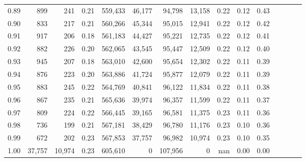 \begin{tabular}{rrrcrrrrrrrrrrr}
0.89 &     899 &     241 &                                       0.21 &  559,433 &   46,177 &   94,798 &  13,158 &  0.22 &  0.12 &                         0.43 \\
0.90 &     833 &     217 &                                       0.21 &  560,266 &   45,344 &   95,015 &  12,941 &  0.22 &  0.12 &                         0.42 \\
0.91 &     917 &     206 &                                       0.18 &  561,183 &   44,427 &   95,221 &  12,735 &  0.22 &  0.12 &                         0.41 \\
0.92 &     882 &     226 &                                       0.20 &  562,065 &   43,545 &   95,447 &  12,509 &  0.22 &  0.12 &                         0.40 \\
0.93 &     945 &     207 &                                       0.18 &  563,010 &   42,600 &   95,654 &  12,302 &  0.22 &  0.11 &                         0.39 \\
0.94 &     876 &     223 &                                       0.20 &  563,886 &   41,724 &   95,877 &  12,079 &  0.22 &  0.11 &                         0.39 \\
0.95 &     883 &     245 &                                       0.22 &  564,769 &   40,841 &   96,122 &  11,834 &  0.22 &  0.11 &                         0.38 \\
0.96 &     867 &     235 &                                       0.21 &  565,636 &   39,974 &   96,357 &  11,599 &  0.22 &  0.11 &                         0.37 \\
0.97 &     809 &     224 &                                       0.22 &  566,445 &   39,165 &   96,581 &  11,375 &  0.23 &  0.11 &                         0.36 \\
0.98 &     736 &     199 &                                       0.21 &  567,181 &   38,429 &   96,780 &  11,176 &  0.23 &  0.10 &                         0.36 \\
0.99 &     672 &     202 &                                       0.23 &  567,853 &   37,757 &   96,982 &  10,974 &  0.23 &  0.10 &                         0.35 \\
1.00 &  37,757 &  10,974 &                                       0.23 &  605,610 &        0 &  107,956 &       0 &   nan &  0.00 &                         0.00 \\
\bottomrule
\end{tabular}
